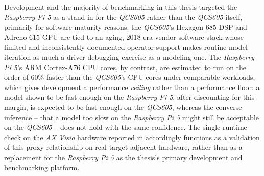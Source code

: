 Development and the majority of benchmarking in this thesis targeted the \textit{Raspberry Pi 5} as a stand-in for the \textit{QCS605} rather than the \textit{QCS605} itself, primarily for software-maturity reasons: the \textit{QCS605}'s Hexagon 685 DSP and Adreno 615 GPU are tied to an aging, 2018-era vendor software stack whose limited and inconsistently documented operator support makes routine model iteration as much a driver-debugging exercise as a modeling one. The \textit{Raspberry Pi 5}'s ARM Cortex-A76 CPU cores, by contrast, are estimated to run on the order of $60\%$ faster than the \textit{QCS605}'s CPU cores under comparable workloads, which gives development a performance \emph{ceiling} rather than a performance floor: a model shown to be fast enough on the \textit{Raspberry Pi 5}, after discounting for this margin, is expected to be fast enough on the \textit{QCS605}, whereas the converse inference -- that a model too slow on the \textit{Raspberry Pi 5} might still be acceptable on the \textit{QCS605} -- does not hold with the same confidence. The single runtime check on the \textit{AX Visio} hardware reported in  accordingly functions as a validation of this proxy relationship on real target-adjacent hardware, rather than as a replacement for the \textit{Raspberry Pi 5} as the thesis's primary development and benchmarking platform.
